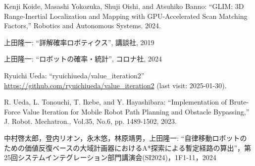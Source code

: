 \documentclass[twocolumn,9pt]{jsproceedings}
\begin{document}
\begin{thebibliography}{99}
  Kenji Koide, Masashi Yokozuka, Shuji Oishi, and Atsuhiko Banno: ``GLIM: 3D Range-Inertial Localization and Mapping with GPU-Accelerated Scan Matching Factors,''
  Robotics and Autonomous Systems. 2024.

    上田隆一: ``詳解確率ロボティクス'', 講談社, 2019

    上田隆一: ``ロボットの確率・統計'', コロナ社, 2024

    Ryuichi Ueda: ``ryuichiueda/value\_iteration2'' \url{https://github.com/ryuichiueda/value_iteration2} (last visit: 2025-01-30).

  R. Ueda, L. Tonouchi, T. Ikebe, and Y. Hayashibara: ``Implementation of Brute-Force Value Iteration for Mobile Robot Path Planning and Obstacle Bypassing,''
  J. Robot. Mechatron., Vol.35, No.6, pp. 1489-1502, 2023.

    中村啓太郎，登内リオン，永木悠，林原靖男，上田隆一: ``自律移動ロボットのための価値反復ベースの大域計画器におけるA*探索による暫定経路の算出''，第25回システムインテグレーション部門講演会(SI2024)，1F1-11，2024







\end{thebibliography}
\end{document}
